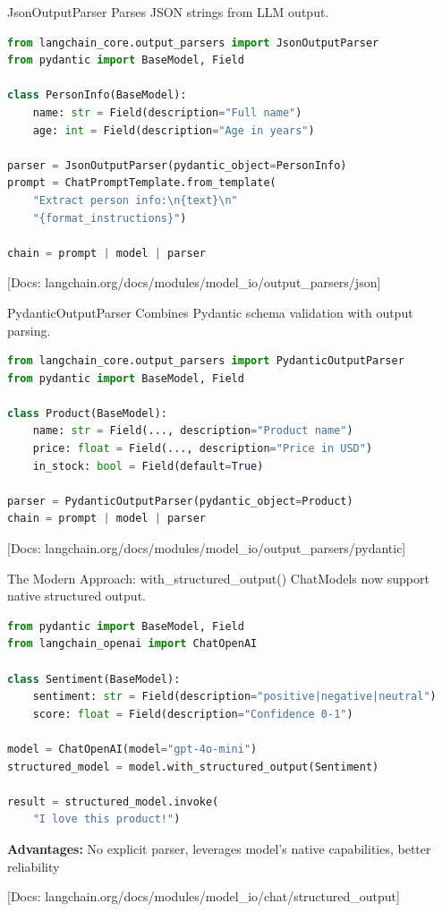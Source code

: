 \documentclass[aspectratio=169,11pt]{beamer}
\newcommand{\docref}[1]{{\scriptsize\color{docgray}[Docs: #1]}}
\begin{document}
\begin{frame}[fragile]{JsonOutputParser}
Parses JSON strings from LLM output.

\begin{lstlisting}[language=Python]
from langchain_core.output_parsers import JsonOutputParser
from pydantic import BaseModel, Field

class PersonInfo(BaseModel):
    name: str = Field(description="Full name")
    age: int = Field(description="Age in years")

parser = JsonOutputParser(pydantic_object=PersonInfo)
prompt = ChatPromptTemplate.from_template(
    "Extract person info:\n{text}\n"
    "{format_instructions}")

chain = prompt | model | parser
\end{lstlisting}

\docref{langchain.org/docs/modules/model\_io/output\_parsers/json}
\end{frame}

\begin{frame}[fragile]{PydanticOutputParser}
Combines Pydantic schema validation with output parsing.

\begin{lstlisting}[language=Python]
from langchain_core.output_parsers import PydanticOutputParser
from pydantic import BaseModel, Field

class Product(BaseModel):
    name: str = Field(..., description="Product name")
    price: float = Field(..., description="Price in USD")
    in_stock: bool = Field(default=True)

parser = PydanticOutputParser(pydantic_object=Product)
chain = prompt | model | parser
\end{lstlisting}

\vspace{0.1cm}

\docref{langchain.org/docs/modules/model\_io/output\_parsers/pydantic}
\end{frame}

\begin{frame}[fragile]{The Modern Approach: with\_structured\_output()}
ChatModels now support native structured output.

\begin{lstlisting}[language=Python]
from pydantic import BaseModel, Field
from langchain_openai import ChatOpenAI

class Sentiment(BaseModel):
    sentiment: str = Field(description="positive|negative|neutral")
    score: float = Field(description="Confidence 0-1")

model = ChatOpenAI(model="gpt-4o-mini")
structured_model = model.with_structured_output(Sentiment)

result = structured_model.invoke(
    "I love this product!")
\end{lstlisting}

\vspace{0.1cm}

\textbf{Advantages:} No explicit parser, leverages model's native capabilities, better reliability

\docref{langchain.org/docs/modules/model\_io/chat/structured\_output}
\end{frame}
\end{document}
